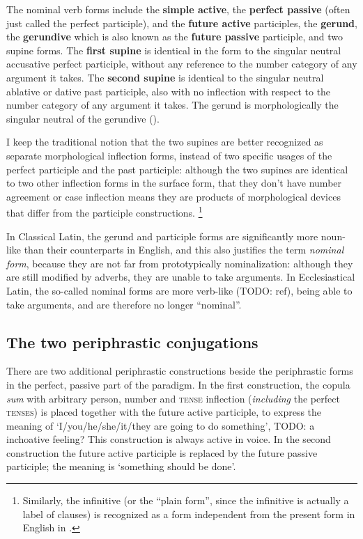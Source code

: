 \documentclass[a4paper, oneside, 12pt]{report}
\newcommand*{\citepage}[1]{p.~{#1}}
\newcommand*{\concept}[1]{\textbf{#1}}
\newcommand*{\term}[1]{\emph{#1}}
\newcommand{\form}[1]{\emph{#1}}
\newcommand*{\category}[1]{\textsc{#1}}
\newcommand{\translate}[1]{`#1'}
\begin{document}
The nominal verb forms include 
the \concept{simple active}, 
the \concept{perfect passive} (often just called the perfect participle), 
and the \concept{future active} participles,
the \concept{gerund}, 
the \concept{gerundive} which is also known as the \concept{future passive} participle, 
and two supine forms.
The \concept{first supine} is identical in the form to the singular neutral accusative perfect participle,
without any reference to the number category of any argument it takes.
The \concept{second supine} is identical to the singular neutral ablative or dative past participle,
also with no inflection with respect to the number category of any argument it takes.
The gerund is morphologically the singular neutral of the gerundive
().

I keep the traditional notion that 
the two supines are better recognized as separate morphological inflection forms,
instead of two specific usages of the perfect participle and the past participle:
although the two supines are identical to two other inflection forms in the surface form,
that they don't have number agreement or case inflection 
means they are products of morphological devices that differ from the participle constructions.%
\footnote{
    Similarly, the infinitive 
    (or the ``plain form'', since the infinitive is actually a label of clauses)
    is recognized as a form 
    independent from the present form in English in \citet[\citepage{74}]{cgel}.
}

In Classical Latin, the gerund and participle forms are significantly more noun-like 
than their counterparts in English,
and this also justifies the term \term{nominal form},
because they are not far from prototypically nominalization:
although they are still modified by adverbs,
they are unable to take arguments.
In Ecclesiastical Latin, 
the so-called nominal forms are more verb-like (TODO: ref),
being able to take arguments,
and are therefore no longer ``nominal''.

\subsection{The two periphrastic conjugations}

There are two additional periphrastic constructions 
beside the periphrastic forms in the perfect, passive part of the paradigm.
In the first construction, 
the copula \form{sum} with arbitrary person, number and \category{tense} inflection 
(\emph{including} the perfect \category{tenses})
is placed together with the future active participle,
to express the meaning of \translate{I/you/he/she/it/they are going to do something}, 
TODO: a inchoative feeling?
This construction is always active in voice.
In the second construction the future active participle is replaced by the future passive participle;
the meaning is \translate{something should be done}.
\end{document}
